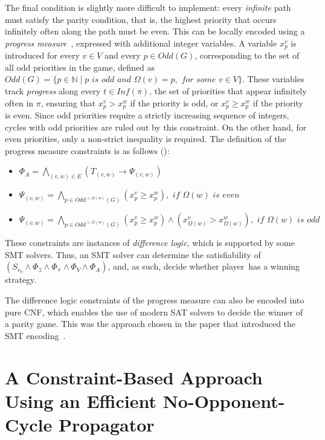 \documentclass[runningheads]{llncs}
\begin{document}
The final condition is slightly more difficult to implement: every \textit{infinite} path must satisfy the parity condition, that is, the highest priority that occurs infinitely often along the path must be even. This can be locally encoded using a \textit{progress measure}~\cite{Heljanko:2012,Jurdziński:2000}, expressed with additional integer variables. A variable $x_p^v$ is introduced for every $v \in V$ and every $p \in \textit{Odd}(G)$, corresponding to the set of all odd priorities in the game, defined as $\textit{Odd}(G) = \{ p\in {\mathbb N} \mid p \textit{ is odd and } \Omega(v) = p, \textit{ for some } v \in V \}$. These variables track \textit{progress} along every $ t \in \textit{Inf}(\pi) $, the set of priorities that appear infinitely often in $\pi$, ensuring that $x_p^v > x_p^w$ if the priority is odd, or $x_p^v \geq x_p^w$ if the priority is even. Since odd priorities require a strictly increasing sequence of integers, cycles with odd priorities are ruled out by this constraint. On the other hand, for even priorities, only a non-strict inequality is required.
%
The definition of the progress measure constraints is as follows (\cite{Heljanko:2012,Cotton:2004}):

\begin{itemize}
\item $\Phi_A = \bigwedge_{(v,w) \in E} \left(T_{(v,w)} \rightarrow \Psi_{(v,w)}\right)$
\item $\Psi_{(v,w)} = \bigwedge_{p \in \textit{Odd}^{>\Omega(w)}(G)} (x_p^v \geqslant x_p^w), \textit{ if } \Omega(w) \textit{ is even}$
\item $\Psi_{(v,w)} = \bigwedge_{p \in \textit{Odd}^{>\Omega(w)}(G)} (x_p^v \geqslant x_p^w) \land 
(x_{\Omega(w)}^v > x_{\Omega(w)}^w), \textit{ if } \Omega(w) \textit{ is odd}$
\end{itemize}

These constraints are instances of {\em difference logic}, which is supported by some SMT solvers. Thus, an SMT solver can determine the satisfiability of~$(S_{v_0} \wedge \Phi_{\exists} \wedge \Phi_{\forall} \wedge \Phi_V \wedge \Phi_A)$, and, as such, decide whether player~\even has a winning strategy.

The difference logic constraints of the progress measure can also be encoded into pure CNF, which enables the use of modern SAT solvers to decide the winner of a parity game. This was the approach chosen in the paper that introduced the SMT encoding~\cite{Heljanko:2012}. 

\section{A Constraint-Based Approach Using an Efficient No-Opponent-Cycle Propagator}
\end{document}
